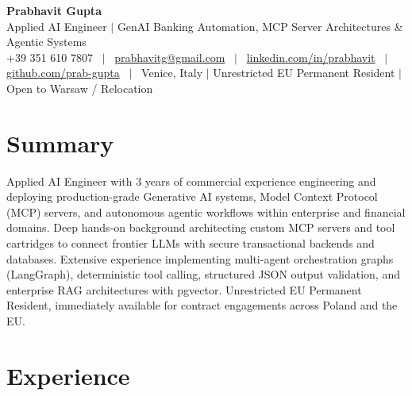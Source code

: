 \documentclass[a4paper,10pt]{article}
\begin{document}
\begin{minipage}[c]{0.80\textwidth}
  {\Huge\bfseries Prabhavit Gupta}\\[3pt]
  {\color{accent}\large Applied AI Engineer $\vert$ GenAI Banking Automation, MCP Server Architectures \& Agentic Systems}\\[6pt]
  {\footnotesize +39 351 610 7807 ~$\vert$~
  \href{mailto:prabhavitg@gmail.com}{prabhavitg@gmail.com} ~$\vert$~
  \href{https://www.linkedin.com/in/prabhavit/}{linkedin.com/in/prabhavit} ~$\vert$~
  \href{https://github.com/prab-gupta}{github.com/prab-gupta} ~$\vert$~
  Venice, Italy $\vert$ Unrestricted EU Permanent Resident $\vert$ Open to Warsaw / Relocation}
\end{minipage}\hfill

\section{Summary}
Applied AI Engineer with 3 years of commercial experience engineering and deploying production-grade Generative AI systems, Model Context Protocol (MCP) servers, and autonomous agentic workflows within enterprise and financial domains. Deep hands-on background architecting custom MCP servers and tool cartridges to connect frontier LLMs with secure transactional backends and databases. Extensive experience implementing multi-agent orchestration graphs (LangGraph), deterministic tool calling, structured JSON output validation, and enterprise RAG architectures with pgvector. Unrestricted EU Permanent Resident, immediately available for contract engagements across Poland and the EU.

\section{Experience}
\end{document}
